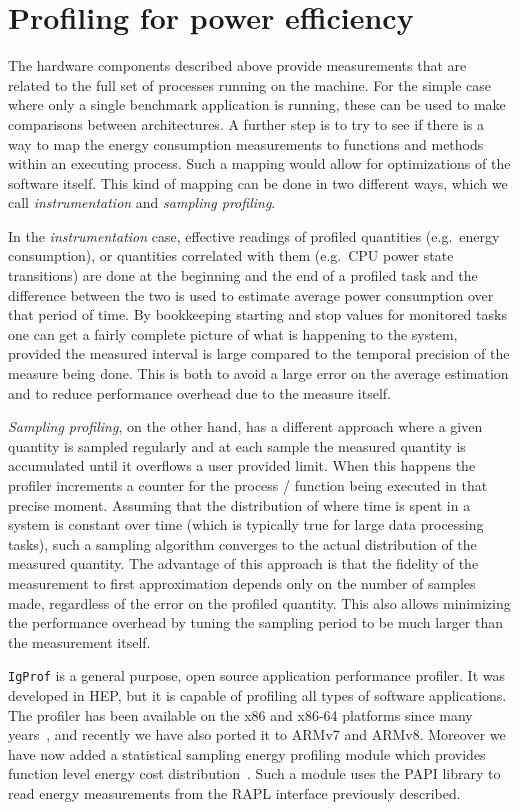 \documentclass[a4paper]{jpconf}
\begin{document}
\section{Profiling for power efficiency}
\label{sec:sampling}

The hardware components described above provide measurements that
are related to the full set of processes running on the machine.
For the simple case where only a single benchmark application is running, 
these can be used to make comparisons between architectures.
A further step is to try to see if there is a way to map the energy 
consumption measurements to functions and methods within an
executing process. Such a mapping would allow for optimizations of
the software itself.
This kind of mapping can be done in two different ways, which we call
{\it instrumentation} and {\it sampling profiling}.

In the {\it instrumentation} case, effective readings of profiled
quantities (e.g.\ energy consumption), or quantities correlated with
them (e.g.\ CPU power state transitions) are done at the beginning
and the end of a profiled task and the difference between the two
is used to estimate average power consumption over that period of
time. By bookkeeping starting and stop values for monitored tasks
one can get a fairly complete picture of what is happening to the
system,  provided the measured interval is large compared to the
temporal precision of the measure being done. This is both to avoid
a large error on the average estimation and to reduce performance
overhead due to the measure itself.

{\it Sampling profiling}, on the other hand, has a different approach where
a given quantity is sampled regularly and at each sample the measured
quantity is accumulated until it overflows a user provided limit.
When this happens the profiler increments a counter for the process /
function being executed in that precise moment. Assuming that the
distribution of where time is spent in a system is constant
over time (which is typically true for large data processing tasks),
such a sampling algorithm converges to the actual distribution of the measured
quantity. The advantage of this approach is that the fidelity of
the measurement to first approximation depends only on the
number of samples made, regardless of the error on the profiled
quantity. This also allows minimizing the performance overhead by tuning the 
sampling period to be much larger than the measurement itself.

\texttt{IgProf} is a general purpose, open source application performance 
profiler. It was developed in HEP, but it is capable of profiling all 
types of software applications.
The profiler has been available on the x86 and x86-64 platforms
since many years~\cite{igprofchep04, igprof-web},
and recently we have also ported it to ARMv7 and ARMv8. 
Moreover we have now added a statistical sampling energy
profiling module which provides function level energy cost
distribution~\cite{weaver12}. Such a module uses the PAPI library
to read energy measurements from the RAPL interface previously
described.
\end{document}
